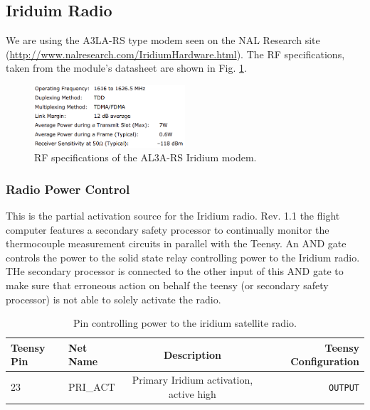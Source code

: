 \documentclass{article}
\begin{document}
\subsection{Iriduim Radio}
We are using the A3LA-RS type modem seen on the NAL Research site (\url{http://www.nalresearch.com/IridiumHardware.html}). The RF specifications, taken from the module's datasheet are shown in Fig. \ref{fig:iridium-rf-specs}.

\begin{figure}[H]
    \centering
    \includegraphics[width=0.5\textwidth]{images/iridium-rf-specs.png}
    \caption{RF specifications of the AL3A-RS Iridium modem.}
    \label{fig:iridium-rf-specs}
\end{figure}
  
\subsubsection{Radio Power Control}
This is the partial activation source for the Iridium radio. Rev. 1.1 the flight computer features a secondary safety processor to continually monitor the thermocouple measurement circuits in parallel with the Teensy. An AND gate controls the power to the solid state relay controlling power to the Iridium radio. THe secondary processor is connected to the other input of this AND gate to make sure that erroneous action on behalf the teensy (or secondary safety processor) is not able to solely activate the radio. 
\begin{table}[H]
    \centering
    \begin{tabular}{l|l|c|r}
   Teensy Pin & Net Name     &  Description  & Teensy Configuration \\
    \hline
    23 & PRI\_ACT   & Primary Iridium activation, active high & \texttt{OUTPUT} 
    \end{tabular}
    \caption{Pin controlling power to the iridium satellite radio.}
    \label{tab:pins-iridium}
\end{table}
\end{document}

